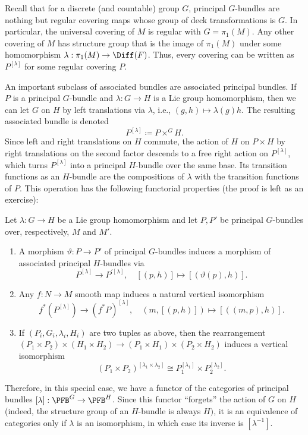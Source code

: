\begin{example}
    Recall that for a discrete (and countable) group $G$, principal $G$-bundles are nothing but regular covering maps whose group of deck transformations is $G$. In particular, the universal covering of $M$ is regular with $G=\pi_1(M)$. Any other covering of $M$ has structure group that is the image of $\pi_1(M)$ under some homomorphism $\lambda:\pi_1(M)\to \Diff(F)$. Thus, every covering can be written as $P^{[\lambda]}$ for some regular covering $P$.
\end{example}



An important subclass of associated bundles are associated principal bundles. If $P$ is a principal $G$-bundle and $\lambda:G\to H$ is a Lie group homomorphism, then we can let $G$ on $H$ by left translations via $\lambda$, i.e., $(g,h)\mapsto \lambda(g)h$. The resulting associated bundle is denoted
\[\boxed{P^{[\lambda]}\coloneqq P\times^G H.}\]
Since left and right translations on $H$ commute, the action of $H$ on $P\times H$ by right translations on the second factor descends to a free right action on $P^{[\lambda]}$, which turns $P^{[\lambda]}$ into a principal $H$-bundle over the same base. Its transition functions as an $H$-bundle are the compositions of $\lambda$ with the transition functions of $P$. This operation has the following functorial properties (the proof is left as an exercise):
\begin{prop}
    Let $\lambda:G\to H$ be a Lie group homomorphism and let $P,P'$ be principal $G$-bundles over, respectively, $M$ and $M'$.
    \begin{enumerate}
        \item A morphism $\vartheta:P\to P'$ of principal $G$-bundles induces a morphism of associated principal $H$-bundles via
        \[P^{[\lambda]}\to P^{\prime[\lambda]},\quad [(p,h)]\mapsto \left[\left(\vartheta(p),h\right)\right].\]
        \item Any $f:N\to M$ smooth map induces a natural vertical isomorphism
        \[f^\ast\left(P^{[\lambda]}\right)\to (f^\ast P)^{[\lambda]},\quad \left(m,[(p,h)]\right)\mapsto \left[\left((m,p),h\right)\right].\]
        \item If $(P_i,G_i,\lambda_i,H_i)$ are two tuples as above, then the rearrangement $(P_1\times P_2)\times(H_1\times H_2)\to (P_1\times H_1)\times(P_2\times H_2)$ induces a vertical isomorphism
        \[\left(P_1\times P_2\right)^{[\lambda_1\times\lambda_2]}\cong P_1^{[\lambda_1]}\times P_2^{[\lambda_2]}.\]
    \end{enumerate}
\end{prop}
Therefore, in this special case, we have a functor of the categories of principal bundles $[\lambda]:\PFB^G\to \PFB^H$. Since this functor ``forgets'' the action of $G$ on $H$ (indeed, the structure group of an $H$-bundle is always $H)$, it is an equivalence of categories only if $\lambda$ is an isomorphism, in which case its inverse is $[\lambda^{-1}]$.


